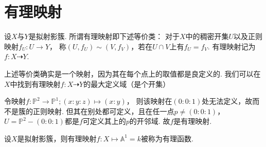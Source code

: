 \section{有理映射}
    \begin{definition}
        设$X$与$Y$是拟射影簇. 所谓有理映射即下述等价类：
        对于$X$中的稠密开集$U$以及正则映射$f_{U}\colon U \rightarrow Y$，
        称$(U,f_{U}) \sim (V,f_{V})$，若在$U \cap V$上有$f_{U}=f_{V}$.
        有理映射记为$f\colon X \dashrightarrow Y$. 
    \end{definition}

    上述等价类确实是一个映射，因为其在每个点上的取值都是良定义的. 
    我们可以在$X$中找到有理映射$f\colon X \dashrightarrow Y$的最大定义域（是个开集）

    \begin{example}
      令映射$f\colon\mathbb{P}^{2} \rightarrow \mathbb{P}^{1};(x:y:z) \mapsto (x:y)$，
      则该映射在$(0:0:1)$处无法定义，故而不是簇的正则映射. 
      但其在别处都可定义，且在任一点$p \neq (0:0:1)$，
      $U=\mathbb{P}^{2}-(0:0:1)$都是$f$可定义其上的$p$的开邻域. 
      故$f$是有理映射.
    \end{example}

    \begin{definition}
        设$X$是拟射影簇，则有理映射$f\colon X \mapsto \mathbb{A}^{1} = k$被称为有理函数.
    \end{definition}

